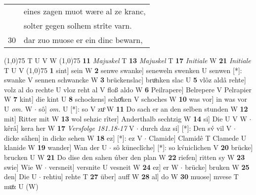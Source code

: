 \documentclass[8pt,a4paper,notitlepage]{article}
\begin{document}
\begin{table}[ht]
\begin{minipage}[t]{0.5\linewidth}
\begin{tabular}{rl}
 & eines zagen muot wære al ze kranc,\\ 
 & solter gegen solhem strîte varn.\\ 
30 & dar zuo muose er ein dinc bewarn,\\ 
\end{tabular}
\scriptsize
\line(1,0){75} \newline
T U V W \newline
\line(1,0){75} \newline
\textbf{11} \textit{Majuskel} T  \textbf{13} \textit{Majuskel} T  \textbf{17} \textit{Initiale} W  \textbf{21} \textit{Initiale} T U V  \newline
\line(1,0){75} \newline
\textbf{1} sint] sein W \textbf{2} senwe swanke] seneweln swenken U senwen [*]: swanke V sennen schwancke W \textbf{3} brückenslac] bruͦnken slac U \textbf{5} vlôz aldâ rehte] volz al do rechte U vloz reht al V floß aldo W \textbf{6} Peilrapere] Belrepere V Pelrapier W \textbf{7} kint] die kint U \textbf{8} schockens] schoͤken V schoches W \textbf{10} was vor] in was vor U \textit{om.} W  $\cdot$ sô] \textit{om.} U [*]: so V zuͦ W \textbf{11} Do sach er an den selben stunden W \textbf{12} mit] Ritter mit W \textbf{13} wol sehzic rîter] Anderthalb sechtzig W \textbf{14} si] Die U V W  $\cdot$ kêrâ] kera her W \textbf{17} \textit{Versfolge 181.18-17} V   $\cdot$ durch daz si] [*]: Den sv́ vil V  $\cdot$ dicke sâhen] in dicke sehen W \textbf{18} ez] [*]: ez V  $\cdot$ Clamide] Clamidê T Clamede U klanide W \textbf{19} wander] Wan der U  $\cdot$ sô küneclîche] [*]: so kv́niclichen V \textbf{20} brücke] brucken U W \textbf{21} Do dise den sahen úber den plan W \textbf{22} riefen] ritten sy W \textbf{23} swie] Wie W  $\cdot$ versneit] versnite U vesneit W \textbf{24} ez] er W  $\cdot$ brücke] bruken W \textbf{25} den] Die U  $\cdot$ rehtiu] rehte T \textbf{27} über] auff W \textbf{28} al] do W \textbf{30} muose] mvese T muͦz U (W) \newline
\end{minipage}
\end{table}
\end{document}
